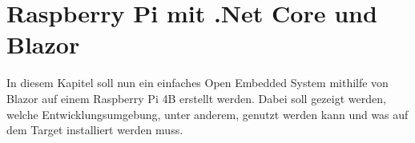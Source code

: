 \chapter{Raspberry Pi mit .Net Core und Blazor}
\label{chp:RaspMitBlazor}
In diesem Kapitel soll nun ein einfaches Open Embedded System mithilfe von Blazor auf einem
Raspberry Pi 4B erstellt werden. Dabei soll gezeigt werden, welche Entwicklungsumgebung, unter
anderem, genutzt werden kann und was auf dem Target installiert werden muss.



%
